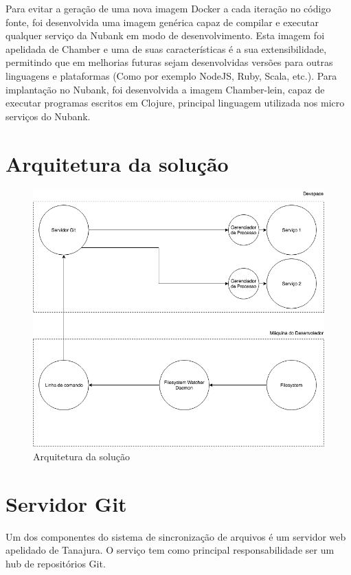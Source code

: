 \documentclass[]{politex}
\begin{document}
	Para evitar a geração de uma nova imagem Docker a cada iteração no código fonte, foi desenvolvida uma imagem genérica capaz de compilar e executar qualquer serviço da Nubank em modo de desenvolvimento. Esta imagem foi apelidada de Chamber e uma de suas características é a sua extensibilidade, permitindo que em melhorias futuras sejam desenvolvidas versões para outras linguagens e plataformas (Como por exemplo NodeJS, Ruby, Scala, etc.). Para implantação no Nubank, foi desenvolvida a imagem Chamber-lein, capaz de executar programas escritos em Clojure, principal linguagem utilizada nos micro serviços do Nubank.
	\section{Arquitetura da solução}
		\begin{figure}[htb]
			\caption{\label{fig_arquitetura}Arquitetura da solução}
			\begin{center}
			\includegraphics[scale=0.50]{arquitetura-da-solucao.png}
			\end{center}
		\end{figure}
	\section{Servidor Git}
	Um dos componentes do sistema de sincronização de arquivos é um servidor web apelidado de Tanajura. O serviço tem como principal responsabilidade ser um hub de repositórios Git.
	
\end{document}
